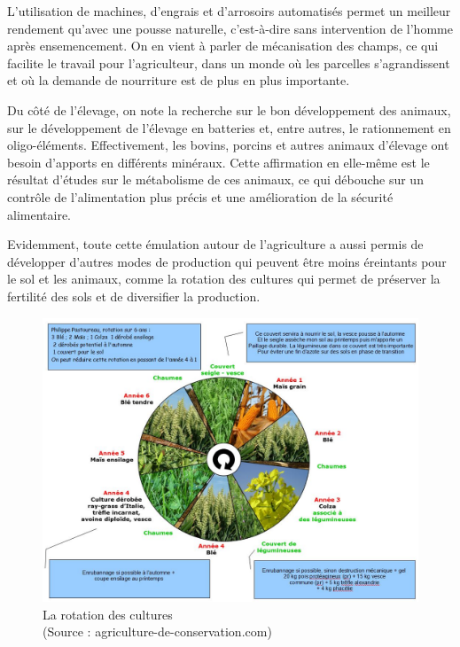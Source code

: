 \documentclass[a4paper,12pt]{report}
\begin{document}
			L’utilisation de machines, d’engrais et d’arrosoirs automatisés permet un meilleur rendement qu’avec une pousse naturelle, c’est-à-dire sans intervention de l’homme après ensemencement. On en vient à parler de mécanisation des champs, ce qui facilite le travail pour l’agriculteur, dans un monde où les parcelles s’agrandissent et où la demande de nourriture est de plus en plus importante.
			
			Du côté de l’élevage, on note la recherche sur le bon développement des animaux, sur le développement de l’élevage en batteries et, entre autres, le rationnement en oligo-éléments\cite{OligoElements}. Effectivement, les bovins, porcins et autres animaux d’élevage ont besoin d’apports en différents minéraux. Cette affirmation en elle-même est le résultat d’études sur le métabolisme de ces animaux, ce qui débouche sur un contrôle de l’alimentation plus précis et une amélioration de la sécurité alimentaire.
			
			Evidemment, toute cette émulation autour de l’agriculture a aussi permis de développer d’autres modes de production qui peuvent être moins éreintants pour le sol et les animaux, comme la rotation des cultures qui permet de préserver la fertilité des sols et de diversifier la production.
			
			\begin{figure}[!h]
			\centering
			\includegraphics[scale=0.6]{Illustrations/Rotation.jpg}
			\caption{La rotation des cultures\\(Source : agriculture-de-conservation.com\cite{RotationSite})}
			\label{Rotation}
			\end{figure}
			
\end{document}

